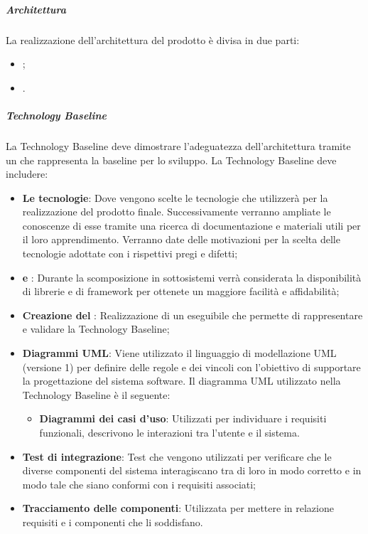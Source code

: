 \subparagraph*{Architettura}
La realizzazione dell’architettura del prodotto è divisa in due parti:
\begin{itemize}
	\item {};
	\item {}.
\end{itemize}

\subparagraph*{Technology Baseline}
La Technology Baseline deve dimostrare l’adeguatezza dell’architettura tramite un  che rappresenta la baseline per lo sviluppo. 
La Technology Baseline deve includere:
\begin{itemize}
	\item \textbf{Le tecnologie}: Dove vengono scelte le tecnologie che \Gruppo{} utilizzerà per la realizzazione del prodotto finale. Successivamente verranno ampliate le conoscenze di esse tramite una ricerca di documentazione e materiali utili per il loro apprendimento. Verranno date delle motivazioni per la scelta delle tecnologie adottate con i rispettivi pregi e difetti;
	\item \textbf{ e }: Durante la scomposizione in sottosistemi verrà considerata la disponibilità di librerie e di framework per ottenete un maggiore facilità e affidabilità;
	\item \textbf{Creazione del }: Realizzazione di un eseguibile che permette di rappresentare e validare la Technology Baseline;
	\item \textbf{Diagrammi UML}: Viene utilizzato il linguaggio di modellazione UML (versione 1) per definire delle regole e dei vincoli con l'obiettivo di supportare la progettazione del sistema software. Il diagramma UML utilizzato nella Technology Baseline è il seguente:
	\begin{itemize}
	\item \textbf{Diagrammi dei casi d'uso}: Utilizzati per individuare i requisiti funzionali, descrivono le interazioni tra l'utente e il sistema.
	\end{itemize}
	\item \textbf{Test di integrazione}: Test che vengono utilizzati per verificare che le diverse componenti del
	sistema interagiscano tra di loro in modo corretto e in modo tale che siano conformi con i requisiti associati;
	\item \textbf{Tracciamento delle componenti}: Utilizzata per mettere in relazione requisiti e i componenti che li soddisfano.
\end{itemize}

